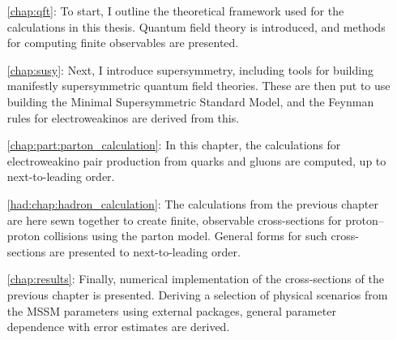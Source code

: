 \begin{itemize}
  \item [\cref{chap:qft}:] To start, I outline the theoretical framework used for the calculations in this thesis. Quantum field theory is introduced, and methods for computing finite observables are presented.
  \item [\cref{chap:susy}:] Next, I introduce supersymmetry, including tools for building manifestly supersymmetric quantum field theories. These are then put to use building the Minimal Supersymmetric Standard Model, and the Feynman rules for electroweakinos are derived from this.
  \item [\cref{chap:part:parton_calculation}:] In this chapter, the calculations for electroweakino pair production from quarks and gluons are computed, up to next-to-leading order.
  \item [\cref{had:chap:hadron_calculation}:] The calculations from the previous chapter are here sewn together to create finite, observable cross-sections for proton--proton collisions using the parton model. General forms for such cross-sections are presented to next-to-leading order.
  \item [\cref{chap:results}:] Finally, numerical implementation of the cross-sections of the previous chapter is presented. Deriving a selection of physical scenarios from the MSSM parameters using external packages, general parameter dependence with error estimates are derived.
\end{itemize}
